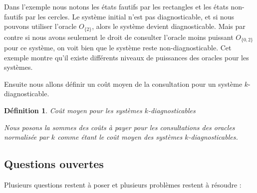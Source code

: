 \documentclass[a4paper,10pt]{article}
\newtheorem{mydef}{D\'efinition}
\begin{document}
\begin{figure}[H]
  \begin{center}
  \end{center}
\end{figure}

Dans l'exemple nous notons les \'etats fautifs par les rectangles et les \'etats non-fautifs par les cercles. Le syst\`eme initial n'est pas diagnosticable, et si nous pouvons utiliser l'oracle $O_{\{2\}}$, alors le système devient diagnosticable. Mais par contre si nous avons seulement le droit de consulter l'oracle moins puissant $O_{\{0,2\}}$ pour ce système, on voit bien que le système reste non-diagnosticable. Cet exemple montre qu'il existe différents niveaux de puissances des oracles pour les systèmes.

Ensuite nous allons d\'efinir un co\^ut moyen de la consultation pour un syst\`eme $k$-diagnosticable.

\begin{mydef}{Co\^ut moyen pour les syst\`emes $k$-diagnosticables}
  
  Nous posons la sommes des co\^uts \`a payer pour les consultations des oracles normalis\'ee par $k$ comme \'etant le co\^ut moyen des syst\`emes $k$-diagnosticables.
\end{mydef}

\subsection{Questions ouvertes}

Plusieurs questions restent à poser et plusieurs problèmes restent à résoudre :
\end{document}
